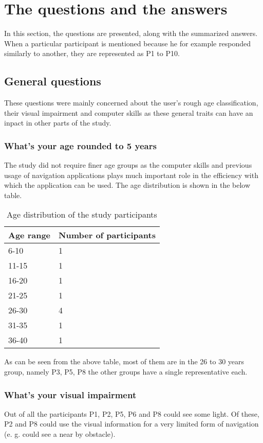 \documentclass[nolof,digital]{fithesis3}
\begin{document}
\section{The questions and the answers}
In this section, the questions are presented, along with the summarized answers. When a particular participant is mentioned because he for example responded similarly to another, they are represented as P1 to P10.
\subsection{General questions}
These questions were mainly concerned about the user's rough age classification, their visual impairment and computer skills as these general traits can have an inpact in other parts of the study.
\subsubsection{What's your age rounded to 5 years}
The study did not require finer age groups as the computer skills and previous usage of navigation applications plays much important role in the efficiency with which the application can be used. The age distribution is shown in the below table.
\begin{table}
\caption{Age distribution of the study participants}
\begin{tabularx}{\textwidth}{ |X|X| }
Age range & Number of participants \\
\hline
6-10 & 1 \\
11-15 & 1 \\
16-20 & 1 \\
21-25  & 1 \\
26-30 & 4 \\
31-35 & 1 \\
36-40 & 1 \\
\end{tabularx}
\end{table}
As can be seen from the above table, most of them are in the 26 to 30 years group, namely P3, P5, P8 the other groups have a single representative each.
\subsubsection{What's your visual impairment}
Out of all the participants P1, P2, P5, P6 and P8 could see some light. Of these, P2 and P8 could use the visual information for a very limited form of navigation (e. g. could see a near by obstacle).
\end{document}
